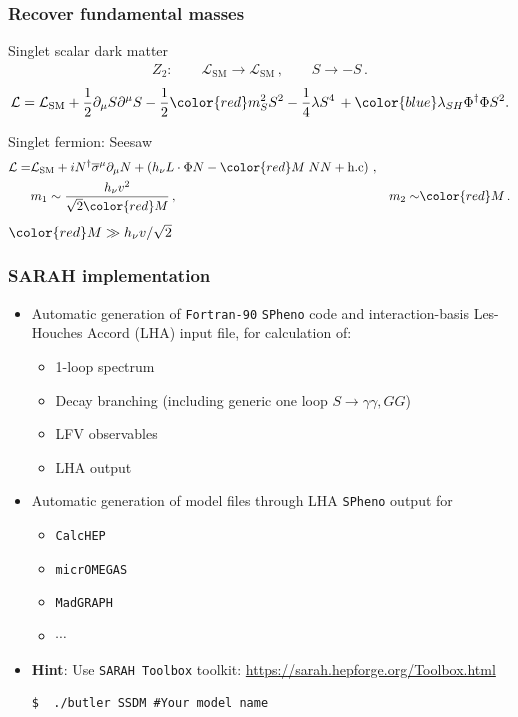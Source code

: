 \documentclass[%
xcolor=dvipsnames,table%
]{beamer}
\begin{document}
\begin{frame}\frametitle{Recover fundamental masses \frownie{}}
  \begin{block}{Singlet scalar dark matter}
    \begin{align*}
      Z_2:\qquad \mathcal{L}_{\text{SM}}\to \mathcal{L}_{\text{SM}}\,,\qquad
           S\to -S\,.
    \end{align*}
    \begin{align*}
      \mathcal{L}=\mathcal{L}_{\text{SM}}+\frac{1}{2}\partial_{\mu}S\partial^{\mu}S-\frac{1}{2} {\color{red}m_S^2}S^{2}-\frac{1}{4}\lambda S^4\,+{\color{blue}\lambda_{SH}} \Phi^{\dagger}\Phi S^2.
    \end{align*}

  \end{block}
  \begin{block}{Singlet fermion: Seesaw}
    \begin{align*}
      \mathcal{L}=&\mathcal{L}_{\text{SM}}+ i N^{\dagger}\overline{\sigma}^{\mu}\partial_{\mu}N+  \left( h_{\nu}L\cdot\Phi N-{\color{red}M}\; N N+\text{h.c} \right)\,,&&\nonumber\\
&m_1\sim \frac{h_{\nu}v^2}{\sqrt{2} {\color{red}M}}\,,& m_2\sim& {\color{red}M}\,.
    \end{align*}
\centering
${\color{red}M}\gg h_{\nu}v/\sqrt{2}$
  \end{block}
\end{frame}

\begin{frame}[fragile]
  \frametitle{SARAH implementation}
  \begin{itemize}
  \item<1->   Automatic generation of \texttt{Fortran-90} \alert{\texttt{SPheno}} code and interaction-basis Les-Houches Accord \alert{(LHA) input file}, for calculation of: 
   \begin{itemize}
  \item  1-loop spectrum
  \item  Decay branching (including generic one loop $S\to \gamma\gamma,GG$)
  \item LFV observables
  \item LHA output 
  \end{itemize}
\item<2-> Automatic generation of model files through \alert{LHA \texttt{SPheno} output} for
  \begin{itemize}
  \item \alert{\texttt{CalcHEP}} 
  \item \alert{\texttt{micrOMEGAS}}
  \item \alert{\texttt{MadGRAPH}}
  \item \alert{$\boldsymbol{\cdots}$}
  \end{itemize}
\item<3> \textbf{Hint}: Use \alert{\texttt{SARAH Toolbox}} toolkit: {\tiny \url{https://sarah.hepforge.org/Toolbox.html}} 
\begin{verbatim}
$  ./butler SSDM #Your model name
\end{verbatim}
  \end{itemize}
\end{frame}
\end{document}
